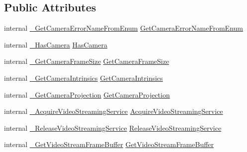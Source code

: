 \subsection*{Public Attributes}
\begin{DoxyCompactItemize}
\item 
internal \mbox{\hyperlink{struct_valve_1_1_v_r_1_1_i_v_r_tracked_camera_a0bf8d42b5ed4c30eb09d04124dfb621e}{\+\_\+\+Get\+Camera\+Error\+Name\+From\+Enum}} \mbox{\hyperlink{struct_valve_1_1_v_r_1_1_i_v_r_tracked_camera_ae0cfbea5e32b404d3e27f9c23f4b8a00}{Get\+Camera\+Error\+Name\+From\+Enum}}
\item 
internal \mbox{\hyperlink{struct_valve_1_1_v_r_1_1_i_v_r_tracked_camera_a4138984fea114155a7a9f4cd9344abcf}{\+\_\+\+Has\+Camera}} \mbox{\hyperlink{struct_valve_1_1_v_r_1_1_i_v_r_tracked_camera_a75e04ffd8ca63f8e4c7ddda1421f14bd}{Has\+Camera}}
\item 
internal \mbox{\hyperlink{struct_valve_1_1_v_r_1_1_i_v_r_tracked_camera_a7a7151ceb5ce18c098884b07ba847502}{\+\_\+\+Get\+Camera\+Frame\+Size}} \mbox{\hyperlink{struct_valve_1_1_v_r_1_1_i_v_r_tracked_camera_ac89b29ee793a06a78b12f79829bae8c1}{Get\+Camera\+Frame\+Size}}
\item 
internal \mbox{\hyperlink{struct_valve_1_1_v_r_1_1_i_v_r_tracked_camera_aacef66b75e9aea2e3f8e98c36f7f8c9a}{\+\_\+\+Get\+Camera\+Intrinsics}} \mbox{\hyperlink{struct_valve_1_1_v_r_1_1_i_v_r_tracked_camera_a81e3d529a4935d87bc3585be53ed51fd}{Get\+Camera\+Intrinsics}}
\item 
internal \mbox{\hyperlink{struct_valve_1_1_v_r_1_1_i_v_r_tracked_camera_a8c5bac72968c107773b0f8e5dc1b1bf1}{\+\_\+\+Get\+Camera\+Projection}} \mbox{\hyperlink{struct_valve_1_1_v_r_1_1_i_v_r_tracked_camera_a023d1a201789c221dbaa7286fa8710b9}{Get\+Camera\+Projection}}
\item 
internal \mbox{\hyperlink{struct_valve_1_1_v_r_1_1_i_v_r_tracked_camera_ac535815424bd4d396ab6ddc1e92065e5}{\+\_\+\+Acquire\+Video\+Streaming\+Service}} \mbox{\hyperlink{struct_valve_1_1_v_r_1_1_i_v_r_tracked_camera_aeffad4ec882ee8014aaf43593f44c9a4}{Acquire\+Video\+Streaming\+Service}}
\item 
internal \mbox{\hyperlink{struct_valve_1_1_v_r_1_1_i_v_r_tracked_camera_ab377dd8e389c9aa7962d424d91a9043b}{\+\_\+\+Release\+Video\+Streaming\+Service}} \mbox{\hyperlink{struct_valve_1_1_v_r_1_1_i_v_r_tracked_camera_a9fbbbc954c14b2f6e25c62fc641b48ca}{Release\+Video\+Streaming\+Service}}
\item 
internal \mbox{\hyperlink{struct_valve_1_1_v_r_1_1_i_v_r_tracked_camera_afdef1fed34343a2452be09cbe044d9ed}{\+\_\+\+Get\+Video\+Stream\+Frame\+Buffer}} \mbox{\hyperlink{struct_valve_1_1_v_r_1_1_i_v_r_tracked_camera_a21af5b8ca53bc1c537a171b8e67e3545}{Get\+Video\+Stream\+Frame\+Buffer}}

\end{DoxyCompactItemize}
